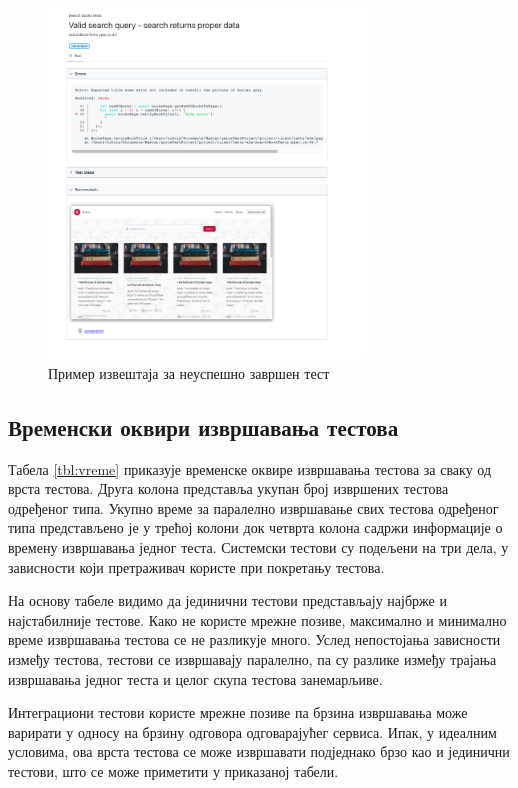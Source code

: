 \documentclass[12pt,oneside]{memoir}
\begin{document}
 \begin{figure}[!ht]
  \centering
  \includegraphics[width=0.75\textwidth]{matfmaster/img/error.png}
  \caption{Пример извештаја за неуспешно завршен тест}
  \label{fig:error}
\end{figure}


 \newpage


\subsection{Временски оквири извршавања тестова}

Табела \ref{tbl:vreme} приказује временске оквире извршавања тестова за сваку од врста тестова. Друга колона представља укупан број извршених тестова одређеног типа. Укупно време за паралелно извршавање свих тестова одређеног типа представљено је у трећој колони док четврта колона садржи информације о времену извршавања једног теста. Системски тестови су подељени на три дела, у зависности који претраживач користе при покретању тестова.

На основу табеле видимо да јединични тестови представљају најбрже и најстабилније тестове. Како не користе мрежне позиве, максимално и минимално време извршавања тестова се не разликује много. Услед непостојања зависности између тестова, тестови се извршавају паралелно, па су разлике између трајања извршавања једног теста и целог скупа тестова занемарљиве.

Интеграциони тестови користе мрежне позиве па брзина извршавања може варирати у односу на брзину одговора одговарајућег сервиса. Ипак, у идеалним условима, ова врста тестова се може извршавати подједнако брзо као и јединични тестови, што се може приметити у приказаној табели.
\end{document}
